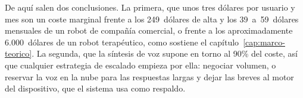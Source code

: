 De aquí salen dos conclusiones. La primera, que unos tres dólares por usuario y mes son un coste marginal frente a los 249~dólares de alta y los 39~a~59~dólares mensuales de un robot de compañía comercial, o frente a los aproximadamente 6.000~dólares de un robot terapéutico, como sostiene el capítulo~\ref{cap:marco-teorico}. La segunda, que la síntesis de voz supone en torno al 90\% del coste, así que cualquier estrategia de escalado empieza por ella: negociar volumen, o reservar la voz en la nube para las respuestas largas y dejar las breves al motor del dispositivo, que el sistema usa como respaldo.
